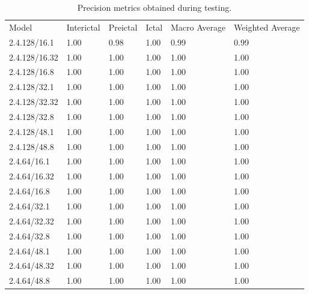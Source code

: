 \documentclass[12pt]{article}
\begin{document}
\begin{table}[H]
\centering
\begin{tabular}{llllll}
Model & Interictal & Preictal & Ictal & Macro Average & Weighted Average \\
 2.4.128/16.1 & 1.00 & 0.98 & 1.00 & 0.99 & 0.99 \\
 2.4.128/16.32 & 1.00 & 1.00 & 1.00 & 1.00 & 1.00 \\
 2.4.128/16.8 & 1.00 & 1.00 & 1.00 & 1.00 & 1.00 \\
 2.4.128/32.1 & 1.00 & 1.00 & 1.00 & 1.00 & 1.00 \\
 2.4.128/32.32 & 1.00 & 1.00 & 1.00 & 1.00 & 1.00 \\
 2.4.128/32.8 & 1.00 & 1.00 & 1.00 & 1.00 & 1.00 \\
 2.4.128/48.1 & 1.00 & 1.00 & 1.00 & 1.00 & 1.00 \\
 2.4.128/48.8 & 1.00 & 1.00 & 1.00 & 1.00 & 1.00 \\
 2.4.64/16.1 & 1.00 & 1.00 & 1.00 & 1.00 & 1.00 \\
 2.4.64/16.32 & 1.00 & 1.00 & 1.00 & 1.00 & 1.00 \\
 2.4.64/16.8 & 1.00 & 1.00 & 1.00 & 1.00 & 1.00 \\
 2.4.64/32.1 & 1.00 & 1.00 & 1.00 & 1.00 & 1.00 \\
 2.4.64/32.32 & 1.00 & 1.00 & 1.00 & 1.00 & 1.00 \\
 2.4.64/32.8 & 1.00 & 1.00 & 1.00 & 1.00 & 1.00 \\
 2.4.64/48.1 & 1.00 & 1.00 & 1.00 & 1.00 & 1.00 \\
 2.4.64/48.32 & 1.00 & 1.00 & 1.00 & 1.00 & 1.00 \\
 2.4.64/48.8 & 1.00 & 1.00 & 1.00 & 1.00 & 1.00 \\
\end{tabular}
\caption{Precision metrics obtained during testing.}
\label{tab:precision-metrics}
\end{table}
\end{document}

